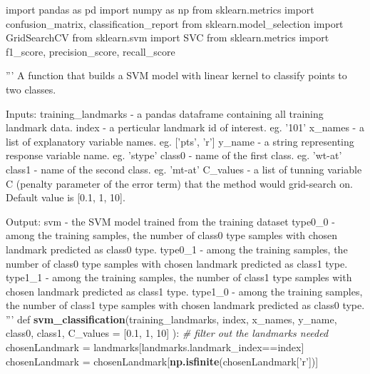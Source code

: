 \documentclass[10pt,letterpaper]{article}
\newenvironment{Shaded}{\begin{snugshade}}{\end{snugshade}}
\newcommand{\KeywordTok}[1]{\textcolor[rgb]{0.13,0.29,0.53}{\textbf{{#1}}}}
\newcommand{\DataTypeTok}[1]{\textcolor[rgb]{0.13,0.29,0.53}{{#1}}}
\newcommand{\DecValTok}[1]{\textcolor[rgb]{0.00,0.00,0.81}{{#1}}}
\newcommand{\FloatTok}[1]{\textcolor[rgb]{0.00,0.00,0.81}{{#1}}}
\newcommand{\StringTok}[1]{\textcolor[rgb]{0.31,0.60,0.02}{{#1}}}
\newcommand{\CommentTok}[1]{\textcolor[rgb]{0.56,0.35,0.01}{\textit{{#1}}}}
\newcommand{\NormalTok}[1]{{#1}}
\begin{document}
\begin{Shaded}
\begin{Highlighting}[]
\NormalTok{import pandas as pd}
\NormalTok{import numpy as np}
\NormalTok{from sklearn.metrics import confusion_matrix, classification_report}
\NormalTok{from sklearn.model_selection import GridSearchCV}
\NormalTok{from sklearn.svm import SVC}
\NormalTok{from sklearn.metrics import f1_score, precision_score, recall_score}

\StringTok{'''}
\StringTok{A function that builds a SVM model with linear kernel to classify points}
\StringTok{to two classes.}

\StringTok{Inputs:}
\StringTok{training_landmarks - a pandas dataframe containing all training landmark}
\StringTok{                     data.}
\StringTok{index              - a perticular landmark id of interest. eg. '}\DecValTok{101}\StringTok{'}
\StringTok{x_names            - a list of explanatory variable names.}
\StringTok{                     eg. ['}\NormalTok{pts}\StringTok{', '}\NormalTok{r}\StringTok{']}
\StringTok{y_name             - a string representing response variable name.}
\StringTok{                     eg. '}\NormalTok{stype}\StringTok{'}
\StringTok{class0             - name of the first class. eg. '}\NormalTok{wt-at}\StringTok{'}
\StringTok{class1             - name of the second class. eg. '}\NormalTok{mt-at}\StringTok{'}
\StringTok{C_values           - a list of tunning variable C (penalty parameter}
\StringTok{                     of the error term) that the method would grid-search}
\StringTok{                     on. Default value is [0.1, 1, 10].}

\StringTok{Output:}
\StringTok{svm                - the SVM model trained from the training dataset}
\StringTok{type0_0            - among the training samples, the number of class0 type}
\StringTok{                     samples with chosen landmark predicted as class0 type.}
\StringTok{type0_1            - among the training samples, the number of class0 type}
\StringTok{                     samples with chosen landmark predicted as class1 type.}
\StringTok{type1_1            - among the training samples, the number of class1 type}
\StringTok{                     samples with chosen landmark predicted as class1 type.}
\StringTok{type1_0            - among the training samples, the number of class1 type}
\StringTok{                     samples with chosen landmark predicted as class0 type.}
\StringTok{'''}
\NormalTok{def }\KeywordTok{svm_classification}\NormalTok{(training_landmarks, index, x_names, y_name, class0,}
        \NormalTok{class1, }\DataTypeTok{C_values =} \NormalTok{[}\FloatTok{0.1}\NormalTok{, }\DecValTok{1}\NormalTok{, }\DecValTok{10}\NormalTok{] ):}
\StringTok{    }\CommentTok{# filter out the landmarks needed}
\StringTok{    }\NormalTok{chosenLandmark =}\StringTok{ }\NormalTok{landmarks[landmarks.landmark_index==index]}
    \NormalTok{chosenLandmark =}\StringTok{ }\NormalTok{chosenLandmark[}\KeywordTok{np.isfinite}\NormalTok{(chosenLandmark[}\StringTok{'r'}\NormalTok{])]}
    

\end{Highlighting}
\end{Shaded}
\end{document}
